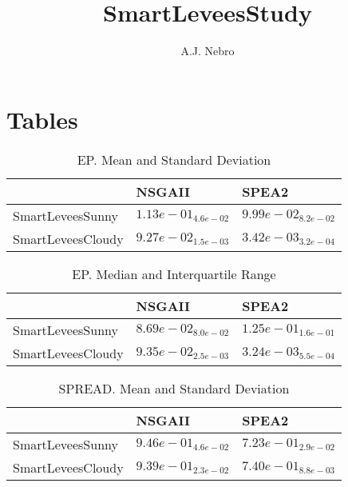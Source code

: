 \documentclass{article}
\title{SmartLeveesStudy}
\author{A.J. Nebro}
\begin{document}
\maketitle
\section{Tables}

\begin{table}
\caption{EP. Mean and Standard Deviation}
\label{table: EP}
\centering
\begin{scriptsize}
\begin{tabular}{lll}
\hline & NSGAII &  SPEA2\\
\hline 
SmartLeveesSunny & \cellcolor{gray25}$  1.13e-01_{ 4.6e-02}$ & \cellcolor{gray95}$  9.99e-02_{ 8.2e-02}$ \\
SmartLeveesCloudy & \cellcolor{gray25}$  9.27e-02_{ 1.5e-03}$ & \cellcolor{gray95}$  3.42e-03_{ 3.2e-04}$ \\
\hline
\end{tabular}
\end{scriptsize}
\end{table}

\begin{table}
\caption{EP. Median and Interquartile Range}
\label{table: EP}
\centering
\begin{scriptsize}
\begin{tabular}{lll}
\hline & NSGAII &  SPEA2\\
\hline 
SmartLeveesSunny & \cellcolor{gray95}$  8.69e-02_{ 8.0e-02}$ & \cellcolor{gray25}$  1.25e-01_{ 1.6e-01}$ \\
SmartLeveesCloudy & \cellcolor{gray25}$  9.35e-02_{ 2.5e-03}$ & \cellcolor{gray95}$  3.24e-03_{ 5.5e-04}$ \\
\hline
\end{tabular}
\end{scriptsize}
\end{table}

\begin{table}
\caption{SPREAD. Mean and Standard Deviation}
\label{table: SPREAD}
\centering
\begin{scriptsize}
\begin{tabular}{lll}
\hline & NSGAII &  SPEA2\\
\hline 
SmartLeveesSunny & \cellcolor{gray25}$  9.46e-01_{ 4.6e-02}$ & \cellcolor{gray95}$  7.23e-01_{ 2.9e-02}$ \\
SmartLeveesCloudy & \cellcolor{gray25}$  9.39e-01_{ 2.3e-02}$ & \cellcolor{gray95}$  7.40e-01_{ 8.8e-03}$ \\
\hline
\end{tabular}
\end{scriptsize}
\end{table}
\end{document}
